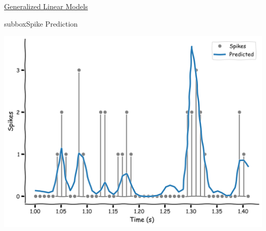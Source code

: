 \begin{textbox}{\href{https://compneuro.neuromatch.io/tutorials/W1D3_GeneralizedLinearModels/student/W1D3_Tutorial1.html}{Generalized Linear Models } }
\begin{subbox}{subbox}{Spike Prediction 
}

\centering
\includegraphics[scale=0.1]{Figures/GLM/GLMFigure4.png}
\end{subbox}
\end{textbox}
